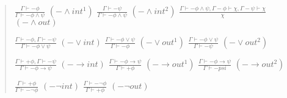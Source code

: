\documentclass[]{article}
\begin{document}
\begin{quote}
$\frac{\Gamma \vdash -\phi}{\Gamma \vdash -\phi\wedge\psi}$ $(-\wedge int^{1})$ 
$\frac{\Gamma \vdash -\psi}{\Gamma \vdash -\phi\wedge\psi}$ $(-\wedge int^{2})$ 
$\frac{\Gamma \vdash -\phi\wedge\psi, \Gamma -\phi \vdash \chi, \Gamma -\psi \vdash \chi}{\chi}$ $(-\wedge out)$

$\frac{\Gamma \vdash -\phi, \Gamma \vdash -\psi}{\Gamma \vdash -\phi\vee\psi}$ $(-\vee int)$ 
$\frac{\Gamma \vdash -\phi\vee\psi}{\Gamma \vdash -\phi}$ $(-\vee out^{1})$ 
$\frac{\Gamma \vdash -\phi\vee\psi}{\Gamma \vdash -\psi}$ $(-\vee out^{2})$

$\frac{\Gamma \vdash +\phi, \Gamma \vdash -\psi}{\Gamma \vdash -\phi\rightarrow\psi}$ $(-\rightarrow int)$
$\frac{\Gamma \vdash -\phi\rightarrow\psi}{\Gamma \vdash +\phi}$ $(-\rightarrow out^{1})$
$\frac{\Gamma \vdash -\phi\rightarrow\psi}{\Gamma \vdash -psi}$ $(-\rightarrow out^{2})$

$\frac{\Gamma \vdash +\phi}{\Gamma \vdash -\neg\phi}$ $(-\neg int)$
$\frac{\Gamma \vdash -\neg\phi}{\Gamma \vdash +\phi}$ $(-\neg out)$
\end{quote}
\end{document}
